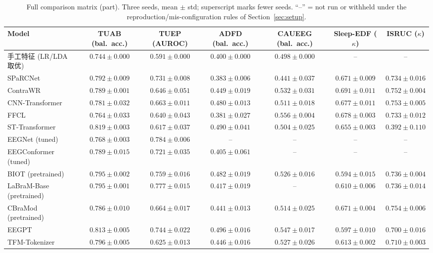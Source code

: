 \begin{table}[h]
\centering
\scriptsize
\caption{Full comparison matrix (part). Three seeds, mean $\pm$ std; superscript marks fewer seeds. ``--'' = not run or withheld under the reproduction/mis-configuration rules of Section~\ref{sec:setup}.}
\begin{tabular}{lcccccc}
\toprule
Model & TUAB (bal.\ acc.) & TUEP (AUROC) & ADFD (bal.\ acc.) & CAUEEG (bal.\ acc.) & Sleep-EDF ($\kappa$) & ISRUC ($\kappa$) \\
\midrule
手工特征 (LR/LDA 取优) & $0.744 \pm 0.000$ & $0.591 \pm 0.000$ & $0.400 \pm 0.000$ & $0.498 \pm 0.000$ & -- & -- \\
SPaRCNet & $0.792 \pm 0.009$ & $0.731 \pm 0.008$ & $0.383 \pm 0.006$ & $0.441 \pm 0.037$ & $0.671 \pm 0.009$ & $0.734 \pm 0.016$ \\
ContraWR & $0.789 \pm 0.001$ & $0.646 \pm 0.051$ & $0.449 \pm 0.019$ & $0.532 \pm 0.031$ & $0.691 \pm 0.011$ & $0.752 \pm 0.004$ \\
CNN-Transformer & $0.781 \pm 0.032$ & $0.663 \pm 0.011$ & $0.480 \pm 0.013$ & $0.511 \pm 0.018$ & $0.677 \pm 0.011$ & $0.753 \pm 0.005$ \\
FFCL & $0.764 \pm 0.033$ & $0.640 \pm 0.043$ & $0.381 \pm 0.027$ & $0.556 \pm 0.004$ & $0.678 \pm 0.003$ & $0.733 \pm 0.012$ \\
ST-Transformer & $0.819 \pm 0.003$ & $0.617 \pm 0.037$ & $0.490 \pm 0.041$ & $0.504 \pm 0.025$ & $0.655 \pm 0.003$ & $0.392 \pm 0.110$ \\
EEGNet (tuned) & $0.768 \pm 0.003$ & $0.784 \pm 0.006$ & -- & -- & -- & -- \\
EEGConformer (tuned) & $0.789 \pm 0.015$ & $0.721 \pm 0.035$ & $0.405 \pm 0.061$ & -- & -- & -- \\
BIOT (pretrained) & $0.795 \pm 0.002$ & $0.759 \pm 0.016$ & $0.482 \pm 0.019$ & $0.526 \pm 0.016$ & $0.594 \pm 0.015$ & $0.736 \pm 0.004$ \\
LaBraM-Base (pretrained) & $0.795 \pm 0.001$ & $0.777 \pm 0.015$ & $0.417 \pm 0.019$ & -- & $0.610 \pm 0.006$ & $0.736 \pm 0.014$ \\
CBraMod (pretrained) & $0.786 \pm 0.010$ & $0.664 \pm 0.017$ & $0.441 \pm 0.013$ & $0.514 \pm 0.025$ & $0.671 \pm 0.004$ & $0.754 \pm 0.006$ \\
EEGPT & $0.813 \pm 0.005$ & $0.744 \pm 0.022$ & $0.496 \pm 0.016$ & $0.547 \pm 0.017$ & $0.597 \pm 0.010$ & $0.700 \pm 0.016$ \\
TFM-Tokenizer & $0.796 \pm 0.005$ & $0.625 \pm 0.013$ & $0.446 \pm 0.016$ & $0.527 \pm 0.026$ & $0.613 \pm 0.002$ & $0.710 \pm 0.003$ \\

\end{tabular}
\end{table}
